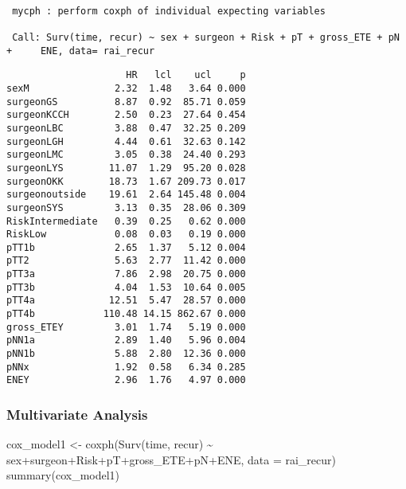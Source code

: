 \documentclass[
  letterpaper,
  DIV=11,
  numbers=noendperiod]{scrartcl}
\newenvironment{Shaded}{\begin{snugshade}}{\end{snugshade}}
\newcommand{\AttributeTok}[1]{\textcolor[rgb]{0.40,0.45,0.13}{#1}}
\newcommand{\FunctionTok}[1]{\textcolor[rgb]{0.28,0.35,0.67}{#1}}
\newcommand{\NormalTok}[1]{\textcolor[rgb]{0.00,0.23,0.31}{#1}}
\newcommand{\OtherTok}[1]{\textcolor[rgb]{0.00,0.23,0.31}{#1}}
\newcommand{\SpecialCharTok}[1]{\textcolor[rgb]{0.37,0.37,0.37}{#1}}
\begin{document}
\begin{verbatim}

 mycph : perform coxph of individual expecting variables

 Call: Surv(time, recur) ~ sex + surgeon + Risk + pT + gross_ETE + pN +     ENE, data= rai_recur 
\end{verbatim}

\begin{verbatim}
                     HR   lcl    ucl     p
sexM               2.32  1.48   3.64 0.000
surgeonGS          8.87  0.92  85.71 0.059
surgeonKCCH        2.50  0.23  27.64 0.454
surgeonLBC         3.88  0.47  32.25 0.209
surgeonLGH         4.44  0.61  32.63 0.142
surgeonLMC         3.05  0.38  24.40 0.293
surgeonLYS        11.07  1.29  95.20 0.028
surgeonOKK        18.73  1.67 209.73 0.017
surgeonoutside    19.61  2.64 145.48 0.004
surgeonSYS         3.13  0.35  28.06 0.309
RiskIntermediate   0.39  0.25   0.62 0.000
RiskLow            0.08  0.03   0.19 0.000
pTT1b              2.65  1.37   5.12 0.004
pTT2               5.63  2.77  11.42 0.000
pTT3a              7.86  2.98  20.75 0.000
pTT3b              4.04  1.53  10.64 0.005
pTT4a             12.51  5.47  28.57 0.000
pTT4b            110.48 14.15 862.67 0.000
gross_ETEY         3.01  1.74   5.19 0.000
pNN1a              2.89  1.40   5.96 0.004
pNN1b              5.88  2.80  12.36 0.000
pNNx               1.92  0.58   6.34 0.285
ENEY               2.96  1.76   4.97 0.000
\end{verbatim}

\subsubsection{Multivariate Analysis}\label{multivariate-analysis}

\begin{Shaded}
\begin{Highlighting}[]
\NormalTok{cox\_model1 }\OtherTok{\textless{}{-}} \FunctionTok{coxph}\NormalTok{(}\FunctionTok{Surv}\NormalTok{(time, recur) }\SpecialCharTok{\textasciitilde{}}\NormalTok{ sex}\SpecialCharTok{+}\NormalTok{surgeon}\SpecialCharTok{+}\NormalTok{Risk}\SpecialCharTok{+}\NormalTok{pT}\SpecialCharTok{+}\NormalTok{gross\_ETE}\SpecialCharTok{+}\NormalTok{pN}\SpecialCharTok{+}\NormalTok{ENE, }\AttributeTok{data =}\NormalTok{ rai\_recur)}
\FunctionTok{summary}\NormalTok{(cox\_model1)}
\end{Highlighting}
\end{Shaded}
\end{document}
